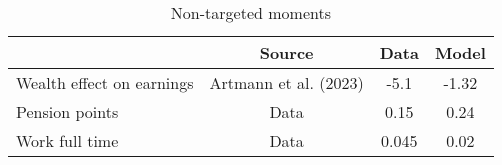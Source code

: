 \begin{table}[htbp]\caption{Non-targeted moments}\label{table:nontargeted_moments}\centering\footnotesize\begin{tabular}{lccc} \toprule  &  Source& Data & Model  \\\midrule    Wealth effect on earnings      & Artmann et al. (2023)          & -5.1 &-1.32\\ Pension points                & Data                           & 0.15 &0.24\\ Work full time              & Data                             & 0.045 &0.02\\  \bottomrule\end{tabular}\end{table}